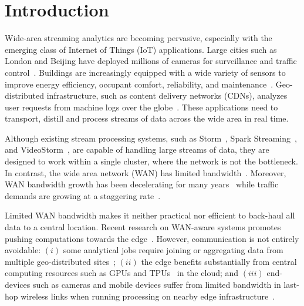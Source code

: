 \section{Introduction}

Wide-area streaming analytics are becoming pervasive, especially with the
emerging class of Internet of Things (IoT) applications.  Large cities such as
London and Beijing have deployed millions of cameras for surveillance and
traffic control~\cite{london.surveillance, skynet}. Buildings are increasingly
equipped with a wide variety of sensors to improve energy efficiency, occupant
comfort, reliability, and
maintenance~\cite{krioukov2012building}. Geo-distributed infrastructure, such as
content delivery networks (CDNs), analyzes user requests from machine logs over the
globe~\cite{mukerjee2015practical}. These applications need to transport,
distill and process streams of data across the wide area in real time.

Although existing stream processing systems, such as
Storm~\cite{toshniwal2014storm}, Spark Streaming~\cite{zaharia2013discretized},
and VideoStorm~\cite{zhang2017live}, are capable of handling large streams of
data, they are designed to work within a single cluster, where the network is
not the bottleneck.  In contrast, the wide area network (WAN) has limited
bandwidth~\cite{hsieh17gaia, vulimiri2015global}. Moreover, WAN
bandwidth growth has been decelerating for many
years~\cite{global2016telegeography} while traffic demands are growing at a staggering
rate~\cite{index2013zettabyte}.

Limited WAN bandwidth makes it neither practical nor efficient to back-haul all data to a central location.
Recent research on WAN-aware systems promotes pushing computations towards the
edge~\cite{satyanarayanan2009case, rabkin2014aggregation, pu2015low}. However,
communication is not entirely avoidable: $(i)$ some
analytical jobs require joining or aggregating data from multiple geo-distributed
sites~\cite{pu2015low, viswanathan2016clarinet}; $(ii)$ the edge benefits
substantially from central computing resources such as GPUs and
TPUs~\cite{abadi2016tensorflow} in the cloud; and $(iii)$
end-devices such as cameras and mobile devices suffer from limited
bandwidth in last-hop wireless links when running processing on
nearby edge infrastructure~\cite{zhang2015design, abari2017enabling}.


